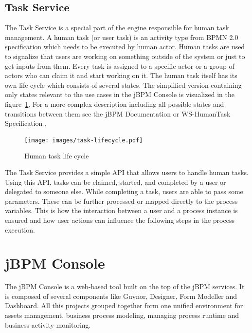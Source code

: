 \documentclass[12pt,oneside,final]{fithesis2}
\begin{document}
\subsection{Task Service}
The Task Service is a special part of the engine responsible for human task management.
A human task (or user task) is an activity type from BPMN 2.0 specification which needs to be executed by human actor.
Human tasks are used to signalize that users are working on something outside of the system or just to get inputs from them.
Every task is assigned to a specific actor or a group of actors who can claim it and start working on it.
The human task itself has its own life cycle which consists of several states.
The simplified version containing only states relevant to the use cases in the jBPM Console is visualized in the figure~\ref{fig:task-lifecycle}.
For a more complex description including all possible states and transitions between them see the jBPM Documentation or WS-HumanTask Specification \cite{jbpm6tasklife,ws-humantask}.

\begin{figure}[ht!]
\centering
\texttt{[image: images/task-lifecycle.pdf]}
\caption{Human task life cycle}
\label{fig:task-lifecycle}
\end{figure}

The Task Service provides a simple API that allows users to handle human tasks.
Using this API, tasks can be claimed, started, and completed by a user or delegated to someone else.
While completing a task, users are able to pass some parameters.
These can be further processed or mapped directly to the process variables.
This is how the interaction between a user and a process instance is ensured and how user actions can influence the following steps in the process execution.

\section{jBPM Console}
The jBPM Console is a web-based tool built on the top of the jBPM services.
It is composed of several components like Guvnor, Designer, Form Modeller and Dashboard.
All this projects grouped together form one unified environment for assets management, business process modeling, managing process runtime and business activity monitoring.
\end{document}

